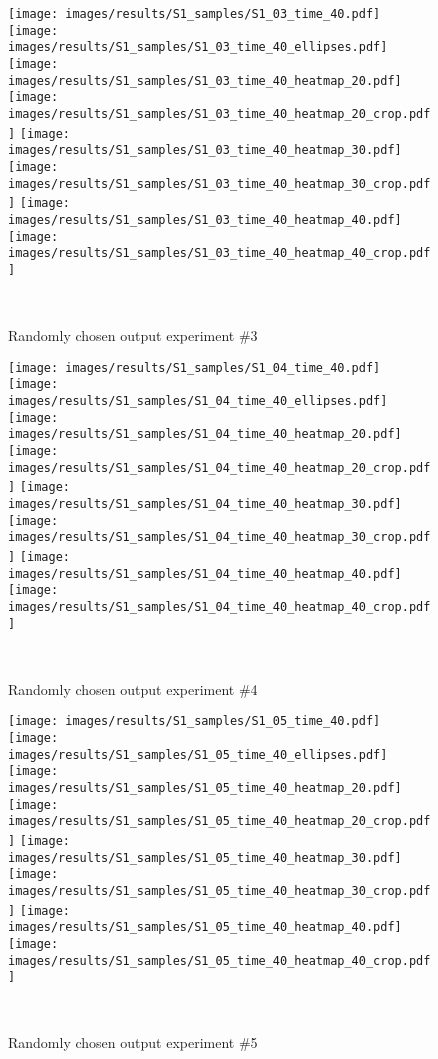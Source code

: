 \begin{figure*}[h]
\centering
\begin{minipage}[t]{\linewidth}
\texttt{[image: images/results/S1\_samples/S1\_03\_time\_40.pdf]}
\texttt{[image: images/results/S1\_samples/S1\_03\_time\_40\_ellipses.pdf]}
\texttt{[image: images/results/S1\_samples/S1\_03\_time\_40\_heatmap\_20.pdf]}
\texttt{[image: images/results/S1\_samples/S1\_03\_time\_40\_heatmap\_20\_crop.pdf]}
\texttt{[image: images/results/S1\_samples/S1\_03\_time\_40\_heatmap\_30.pdf]}
\texttt{[image: images/results/S1\_samples/S1\_03\_time\_40\_heatmap\_30\_crop.pdf]}
\texttt{[image: images/results/S1\_samples/S1\_03\_time\_40\_heatmap\_40.pdf]}
\texttt{[image: images/results/S1\_samples/S1\_03\_time\_40\_heatmap\_40\_crop.pdf]}
\end{minipage}\\
\caption{Randomly chosen output experiment \#3}
\end{figure*}
\begin{figure*}[h]
\centering
\begin{minipage}[t]{\linewidth}
\texttt{[image: images/results/S1\_samples/S1\_04\_time\_40.pdf]}
\texttt{[image: images/results/S1\_samples/S1\_04\_time\_40\_ellipses.pdf]}
\texttt{[image: images/results/S1\_samples/S1\_04\_time\_40\_heatmap\_20.pdf]}
\texttt{[image: images/results/S1\_samples/S1\_04\_time\_40\_heatmap\_20\_crop.pdf]}
\texttt{[image: images/results/S1\_samples/S1\_04\_time\_40\_heatmap\_30.pdf]}
\texttt{[image: images/results/S1\_samples/S1\_04\_time\_40\_heatmap\_30\_crop.pdf]}
\texttt{[image: images/results/S1\_samples/S1\_04\_time\_40\_heatmap\_40.pdf]}
\texttt{[image: images/results/S1\_samples/S1\_04\_time\_40\_heatmap\_40\_crop.pdf]}
\end{minipage}\\
\caption{Randomly chosen output experiment \#4}
\end{figure*}
\begin{figure*}[h]
\centering
\begin{minipage}[t]{\linewidth}
\texttt{[image: images/results/S1\_samples/S1\_05\_time\_40.pdf]}
\texttt{[image: images/results/S1\_samples/S1\_05\_time\_40\_ellipses.pdf]}
\texttt{[image: images/results/S1\_samples/S1\_05\_time\_40\_heatmap\_20.pdf]}
\texttt{[image: images/results/S1\_samples/S1\_05\_time\_40\_heatmap\_20\_crop.pdf]}
\texttt{[image: images/results/S1\_samples/S1\_05\_time\_40\_heatmap\_30.pdf]}
\texttt{[image: images/results/S1\_samples/S1\_05\_time\_40\_heatmap\_30\_crop.pdf]}
\texttt{[image: images/results/S1\_samples/S1\_05\_time\_40\_heatmap\_40.pdf]}
\texttt{[image: images/results/S1\_samples/S1\_05\_time\_40\_heatmap\_40\_crop.pdf]}
\end{minipage}\\
\caption{Randomly chosen output experiment \#5}
\end{figure*}
